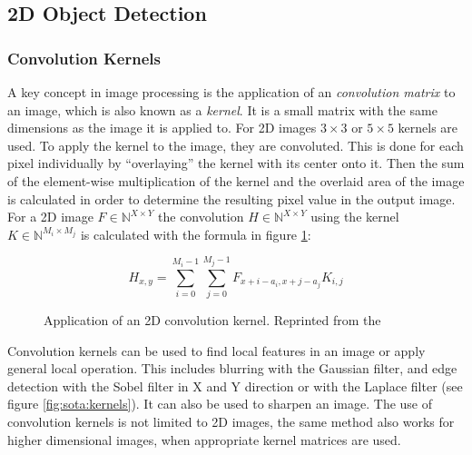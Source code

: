 \subsection{2D Object Detection}

\subsubsection{Convolution Kernels}

A key concept in image processing is the application of an \emph{convolution matrix} to an image, which is also known as a \emph{kernel}. 
It is a small matrix with the same dimensions as the image it is applied to. 
For \ac{2D} images $ 3 \times 3 $ or $5 \times 5 $ kernels are used. 
To apply the kernel to the image, they are convoluted.
This is done for each pixel individually by \enquote{overlaying} the kernel with its center onto it. 
Then the sum of the element-wise multiplication of the kernel and the overlaid area of the image is calculated in order to determine the resulting pixel value in the output image.
For a \ac{2D} image $ F \in \mathbb{N}^{X \times Y} $ the convolution $ H \in \mathbb{N}^{X \times Y} $ using the kernel $ K \in \mathbb{N}^{M_i \times M_j} $ is calculated with the formula in figure \ref{fig:sota:convolution}:

\begin{figure}[h!]
\begin{equation*}
H_{x,y} = \sum_{i=0}^{M_i-1} \sum_{j=0}^{M_j-1} F_{x+i-a_i, x+j-a_j}K_{i,j}
\end{equation*}
\caption[Application of a 2D convolution kernel]{Application of an 2D convolution kernel. Reprinted from the \textcite[][]{opencv2018kernel}}
\label{fig:sota:convolution}
\end{figure}

Convolution kernels can be used to find local features in an image or apply general local operation.
This includes blurring with the Gaussian filter, and edge detection with the Sobel filter in X and Y direction or with the Laplace filter (see figure \ref{fig:sota:kernels}).
It can also be used to sharpen an image. 
The use of convolution kernels is not limited to \ac{2D} images, 
the same method also works for higher dimensional images, 
when appropriate kernel matrices are used.

